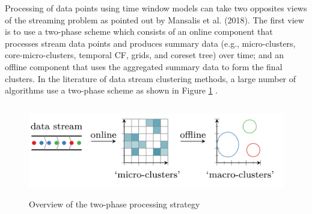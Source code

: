 




Processing of data points using time window models can take two opposites views of the streaming problem as pointed out by Mansalis et al. (2018). The first view is to use a two-phase scheme which consists of an online component that processes stream data points and produces summary data (e.g., micro-clusters, core-micro-clusters, temporal CF, grids, and coreset tree) over time; and an offline component that uses the aggregated summary data to form the final clusters. In the literature of data stream clustering methods, a large number of algorithms use a two-phase scheme as shown in Figure \ref{2phase} . 

\begin{figure}
\centering
\includegraphics[width = 15cm,height = 4cm]{image/Chapters/Chapter2/2phase.png}
\caption{Overview of the two-phase processing strategy \protect\cite{carnein2019optimizing}}
\label{2phase}
\end{figure}


